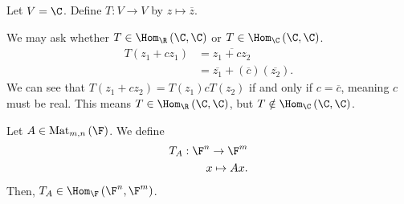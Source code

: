 \documentclass[10pt]{mypackage}
\begin{document}
\begin{example}
  Let $V = \C$. Define $T: V\rightarrow V$ by $z\mapsto \overline{z}$.\newline

  We may ask whether $T\in \Hom_{\R}\left(\C,\C\right)$ or $T\in \Hom_{\C}\left(\C,\C\right)$.
  \begin{align*}
    T\left(z_1 + cz_1\right) &= \overline{z_1 + cz_2}\\
                             &= \overline{z_1} + \left(\overline{c} \right)\left(\overline{z_2}\right).
  \end{align*}
  We can see that $T\left(z_1 + cz_2\right) = T\left(z_1\right) cT\left(z_2\right)$ if and only if $c = \overline{c}$, meaning $c$ must be real. This means $T\in \Hom_{\R}\left(\C,\C\right)$, but $T\notin \Hom_{\C}\left(\C,\C\right)$.
\end{example}
\begin{example}[Matrices]
  Let $A \in \text{Mat}_{m,n}\left(\F\right)$. We define
  \begin{align*}
    T_{A}: \F^n \rightarrow \F^m\\
    x \mapsto Ax.
  \end{align*}
  Then, $T_A \in \Hom_{\F}\left(\F^n,\F^m\right)$.
\end{example}
\end{document}
